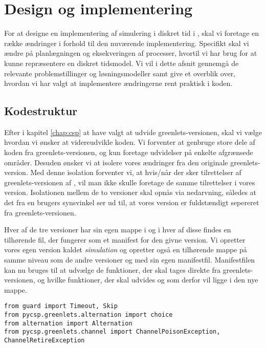 
\section{Design og implementering}
For at designe en implementering af simulering i diskret tid i \pycsp, skal vi foretage en række ændringer i forhold til den nuværende implementering. Specifikt skal vi ændre på planlægningen og eksekveringen af processer, hvortil vi har brug for at kunne repræsentere en diskret tidsmodel. Vi vil i dette afsnit gennemgå de relevante problemstillinger og løsningsmodeller samt give et overblik over, hvordan vi har valgt at implementere ændringerne rent praktisk i koden. 


\subsection{Kodestruktur}  
Efter i kapitel \ref{chap:csp} at have valgt at udvide greenlets-versionen, skal vi vælge hvordan vi ønsker at videreudvikle koden. Vi forventer at genbruge store dele af koden fra greenlets-versionen, og kun foretage udvidelser på enkelte afgrænsede områder. Desuden ønsker vi at isolere vores ændringer fra den originale greenlets-version. Med denne isolation forventer vi, at hvis/når der sker tilrettelser af greenlets-versionen af \pycsp, vil man ikke skulle foretage de samme tilrettelser i vores version. 
Isolationen mellem de to versioner skal opnås via nedarvning, således at det fra en brugers synsvinkel ser ud til, at vores version er fuldstændigt sepereret fra greenlets-versionen.

Hver af de tre versioner har sin egen mappe i \pycsp og i hver af disse findes en tilhørende  fil, der fungerer som et manifest for den givne version. Vi opretter vores egen version kaldet \emph{simulation} og opretter også en tilhørende mappe på samme niveau som de andre versioner og med sin egen manifestfil. Manifestfilen kan nu bruges til at udvælge de funktioner, der skal tages direkte fra greenlets-versionen, og hvilke funktioner, der skal udvides og som derfor vil ligge i den nye mappe.

\begin{lstlisting}[float=hbtp,label=fig:init,caption=Uddrag af \code{\_\_init\_\_.py} for simulationsversionen.]
from guard import Timeout, Skip
from pycsp.greenlets.alternation import choice
from alternation import Alternation
from pycsp.greenlets.channel import ChannelPoisonException, ChannelRetireException
\end{lstlisting}

